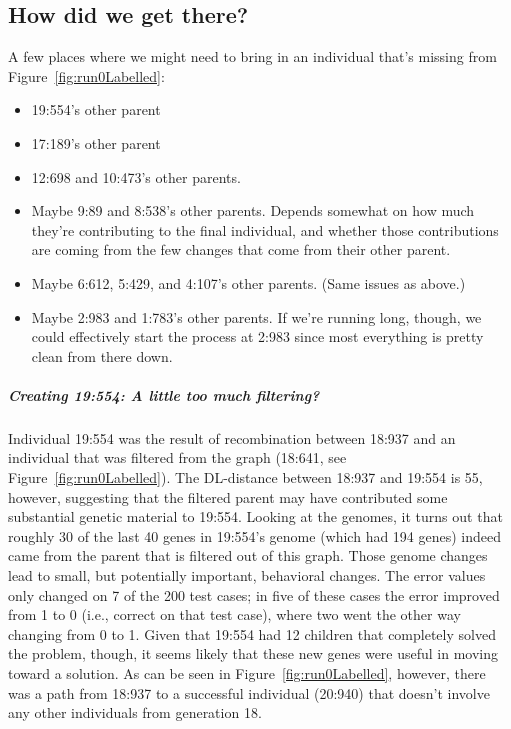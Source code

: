 \subsection{How did we get there?}

A few places where we might need to bring in an individual that's 
missing from Figure~\ref{fig:run0Labelled}:
\begin{itemize}
	\item 19:554's other parent
	\item 17:189's other parent
	\item 12:698 and 10:473's other parents.
	\item Maybe 9:89 and 8:538's other parents. Depends somewhat on how much
	they're contributing to the final individual, and whether those 
	contributions are coming from the few changes that come from their other
	parent.
	\item Maybe 6:612, 5:429, and 4:107's other parents. (Same issues as above.)
	\item Maybe 2:983 and 1:783's other parents. If we're running long, though, 
	we could effectively start the process at 2:983 since most everything is
	pretty clean from there down.
\end{itemize}


\subparagraph{Creating 19:554: A little too much filtering?}

Individual 19:554 was the result of 
recombination between 18:937 and an individual that was filtered from the
graph (18:641, see Figure~\ref{fig:run0Labelled}). 
The DL-distance between 18:937 and 19:554 is 55, however,
suggesting that the filtered parent may have contributed some substantial
genetic material to 19:554. Looking at the genomes, it turns out that 
roughly 30 of the last 40 genes in 19:554's genome (which had 194 genes) 
indeed came from the parent that is filtered out of this graph. Those genome
changes lead to small, but potentially important, behavioral changes. 
The error values only 
changed on 7 of the 200 test cases; in five of these cases the error improved
from 1 to 0 (i.e., correct on that test case), where two went the other way
changing from 0 to 1. Given that 19:554 had 12 children that completely
solved the problem, though, it seems likely that these new genes were useful
in moving toward a solution. As can be seen in Figure~\ref{fig:run0Labelled},
however, there was a path from 18:937 to a successful individual (20:940)
that doesn't involve any other individuals from generation 18.

